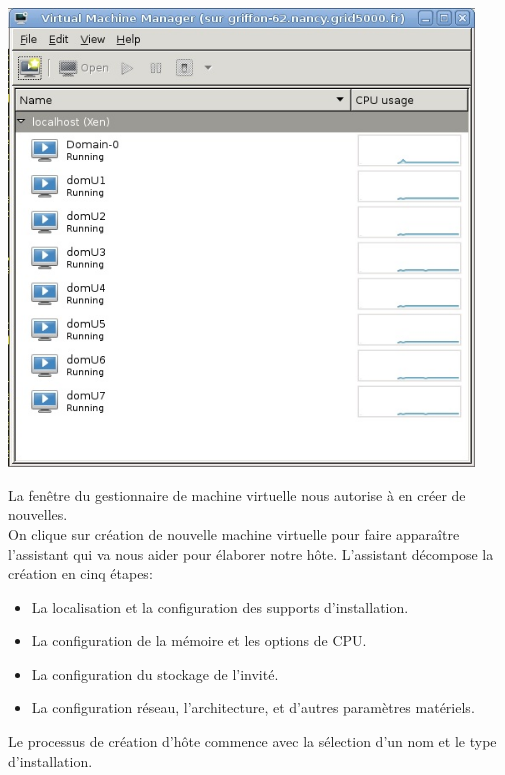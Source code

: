 \begin{center}
\includegraphics[width=350pt]{images/virt.jpg}
\end{center}

La fenêtre du gestionnaire de machine virtuelle nous autorise à en créer de nouvelles.\\
On clique sur création de nouvelle machine virtuelle pour faire apparaître l'assistant qui va nous aider pour élaborer notre hôte.
L'assistant décompose la création en cinq étapes:
\begin{itemize}
\item La localisation et la configuration des supports d'installation.
\item La configuration de la mémoire et les options de CPU.
\item La configuration du stockage de l'invité.
\item La configuration réseau, l'architecture, et d'autres paramètres matériels.
\end{itemize}
Le processus de création d'hôte commence avec la sélection d'un nom et le type d'installation.

